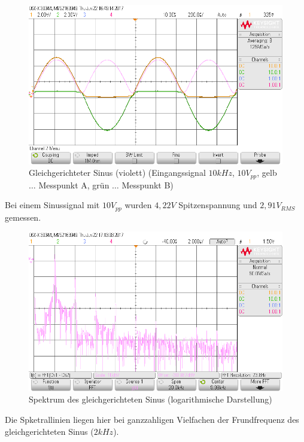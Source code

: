 \documentclass[12pt,a4paper,titlepage]{article}
\begin{document}
\begin{figure}[H]
  \centering
  \includegraphics[width=150mm]{scope_54.png}
  \caption{Gleichgerichteter Sinus (violett) (Eingangssignal $10kHz$, $10V_{pp}$, gelb $\hdots$ Messpunkt A, grün $\hdots$ Messpunkt B)}
\end{figure}

\noindent Bei einem Sinussignal mit $10V_{pp}$ wurden $4,22V$ Spitzenspannung und $2,91V_{RMS}$ gemessen.

\begin{figure}[H]
  \centering
  \includegraphics[width=150mm]{scope_57.png}
  \caption{Spektrum des gleichgerichteten Sinus (logarithmische Darstellung)}
\end{figure}

\noindent Die Spketrallinien liegen hier bei ganzzahligen Vielfachen der Frundfrequenz des gleichgerichteten Sinus ($2kHz$).

\end{document}
